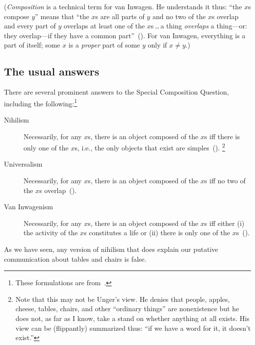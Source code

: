 \documentclass[11pt]{article}
\begin{document}
\begin{spacing}{1.5}
({\em Composition} is a technical term for van Inwagen.  He
understands it thus: ``the $x$s compose $y$'' means that ``the $x$s
are all parts of $y$ and no two of the $x$s overlap and every part of
$y$ overlaps at least one of the $x$s\,\ldots\,a thing {\em overlaps}
a thing---or: they overlap---if they have a common
part''~(\citeyear[29]{inwagen1995}).  For van Inwagen, everything is a
part of itself; some $x$ is a {\em proper} part of some $y$ only if $x
\neq y$.)

\subsection{The usual answers}
There are several prominent answers to the Special Composition
Question, including the following:\footnote{These formulations are
  from~\citet{markosian1998a}.}
\begin{description}
	\item[Nihilism] Necessarily, for any $x$s, there is an object
          composed of the $x$s iff there is only one of the $x$s,
          i.e., the only objects that exist are
          simples~(\citeyear[219]{markosian1998a}).
	\footnote{\label{flip} Note that this may not be Unger's view.
          He denies that people, apples, cheese, tables, chairs, and
          other ``ordinary things'' are nonexistence but he does not,
          as far as I know, take a stand on whether anything at all
          exists.  His view can be (flippantly) summarized thus: ``if
          we have a word for it, it doesn't exist.''}
	\item[Universalism] Necessarily, for any $x$s, there is an
          object composed of the $x$s iff no two of the $x$s
          overlap~(\citeyear[227]{markosian1998a}).
	\item[Van Inwagenism] Necessarily, for any $x$s, there is an
          object composed of the $x$s iff either (i) the activity of
          the $x$s constitutes a life or (ii) there is only one of the
          $x$s~(\citeyear[221]{markosian1998a}).
\end{description}

As we have seen, any version of nihilism that does explain our
putative communication about tables and chairs is false.


\end{spacing}
\end{document}
